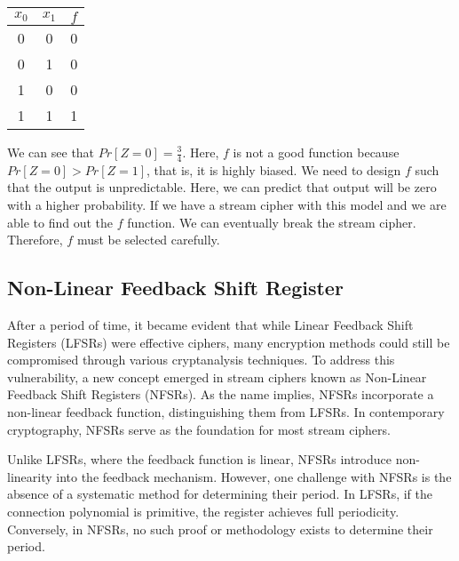 \documentclass[11pt]{article}
\begin{document}
\begin{table}[h]
\centering
  \begin{tabular}{c|c||c}
        \textbf{$x_0$} & \textbf{$x_1$} & \textbf{$f$} \\
        \hline
        0 & 0 & 0 \\
        0 & 1 & 0 \\
        1 & 0 & 0 \\
        1 & 1 & 1 \\
  \end{tabular}
\end{table}
We can see that $Pr[Z = 0] = \frac{3}{4}$. Here, $f$ is not a good function because $Pr[Z = 0] > Pr[Z = 1]$, that is, it is highly biased. We need to design $f$ such that the output is unpredictable. Here, we can predict that output will be zero with a higher probability. If we have a stream cipher with this model and we are able to find out the $f$ function. We can eventually break the stream cipher. Therefore, $f$ must be selected carefully.

\subsection{Non-Linear Feedback Shift Register}
After a period of time, it became evident that while Linear Feedback Shift Registers (LFSRs) were effective ciphers, many encryption methods could still be compromised through various cryptanalysis techniques. To address this vulnerability, a new concept emerged in stream ciphers known as Non-Linear Feedback Shift Registers (NFSRs). As the name implies, NFSRs incorporate a non-linear feedback function, distinguishing them from LFSRs. In contemporary cryptography, NFSRs serve as the foundation for most stream ciphers.

Unlike LFSRs, where the feedback function is linear, NFSRs introduce non-linearity into the feedback mechanism. However, one challenge with NFSRs is the absence of a systematic method for determining their period. In LFSRs, if the connection polynomial is primitive, the register achieves full periodicity. Conversely, in NFSRs, no such proof or methodology exists to determine their period.
\end{document}
